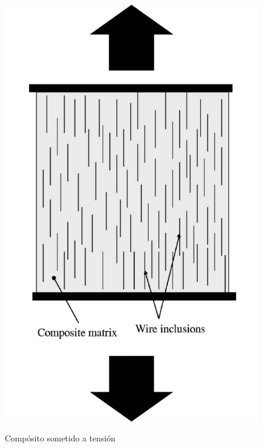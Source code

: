 \documentclass[12pt,letterpaper]{article}
\numberwithin{equation}{section}
\begin{document}
\begin{minipage}{0.5\linewidth}
	\begin{figure}[H]
		\centering\includegraphics[scale=0.4]{Imagenes/matriz_tension.png}\\
		\caption{Compósito sometido a tensión}
		\label{fig:matriz_tension}
	\end{figure}
\end{minipage}
\end{document}

